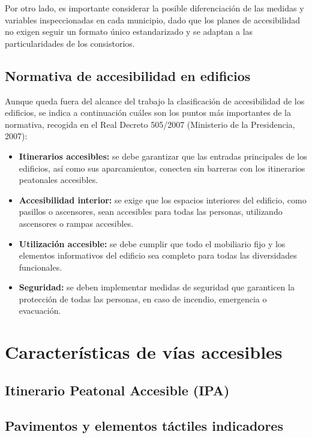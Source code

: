 Por otro lado, es importante considerar la posible diferenciación de las medidas y variables inspeccionadas en cada municipio, dado que los planes de accesibilidad no exigen seguir un formato único estandarizado y se adaptan a las particularidades de los consistorios.
\\

\subsection{Normativa de accesibilidad en edificios}
Aunque queda fuera del alcance del trabajo la clasificación de accesibilidad de los edificios, se indica a continuación cuáles son los puntos más importantes de la normativa, recogida en el Real Decreto 505/2007 (Ministerio de la Presidencia, 2007):
\begin{itemize}
    \item \textbf{Itinerarios accesibles:} se debe garantizar que las entradas principales de los edificios, así como sus aparcamientos, conecten sin barreras con los itinerarios peatonales accesibles.
    \item \textbf{Accesibilidad interior:} se exige que los espacios interiores del edificio, como pasillos o ascensores, sean accesibles para todas las personas, utilizando ascensores o rampas accesibles.
    \item \textbf{Utilización accesible:} se debe cumplir que todo el mobiliario fijo y los elementos informativos del edificio sea completo para todas las diversidades funcionales.
    \item \textbf{Seguridad:} se deben implementar medidas de seguridad que garanticen la protección de todas las personas, en caso de incendio, emergencia o evacuación.
\end{itemize}


\section{Características de vías accesibles}

\subsection{Itinerario Peatonal Accesible (IPA)}

\subsection{Pavimentos y elementos táctiles indicadores}


